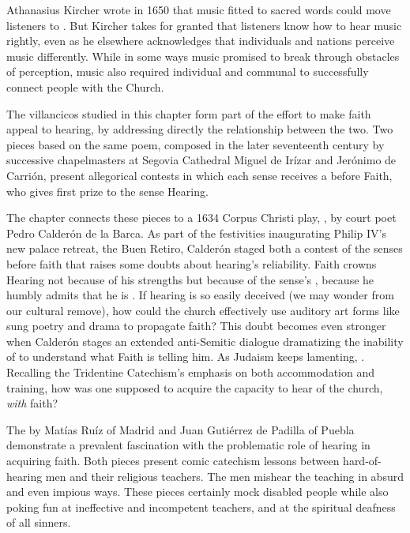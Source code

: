 \documentclass{vcbook-proposal}
\begin{document}
Athanasius Kircher wrote in 1650 that music fitted to sacred words could move listeners to .
But Kircher takes for granted that listeners know how to hear music rightly, even as he elsewhere acknowledges that individuals and nations perceive music differently.
While in some ways music promised to break through obstacles of perception, music also required individual and communal  to successfully connect people with the Church.

The villancicos studied in this chapter form part of the effort to make faith appeal to hearing, by addressing directly the relationship between the two.
Two pieces based on the same poem, composed in the later seventeenth century by successive chapelmasters at Segovia Cathedral Miguel de Irízar and Jerónimo de Carrión, present allegorical contests in which each sense receives a  before Faith, who gives first prize to the sense Hearing.

The chapter connects these pieces to a 1634 Corpus Christi play, , by court poet Pedro Calderón de la Barca.
As part of the festivities inaugurating Philip IV's new palace retreat, the Buen Retiro, Calderón staged both a contest of the senses before faith that raises some doubts about hearing's reliability.
Faith crowns Hearing not because of his strengths but because of the sense's , because he humbly admits that he is .
If hearing is so easily deceived (we may wonder from our cultural remove), how could the church effectively use auditory art forms like sung poetry and drama to propagate faith?
This doubt becomes even stronger when Calderón stages an extended anti-Semitic dialogue dramatizing the inability of  to understand what Faith is telling him.
As Judaism keeps lamenting, .
Recalling the Tridentine Catechism's emphasis on both accommodation and training, how was one supposed to acquire the capacity to hear  of the church, \emph{with} faith?

The  by Matías Ruíz of Madrid and Juan Gutiérrez de Padilla of Puebla demonstrate a prevalent fascination with the problematic role of hearing in acquiring faith.
Both pieces present comic catechism lessons between hard-of-hearing men and their religious teachers.
The  men mishear the teaching in absurd and even impious ways.
These pieces certainly mock disabled people while also poking fun at ineffective and incompetent teachers, and at the spiritual deafness of all sinners.
\end{document}
